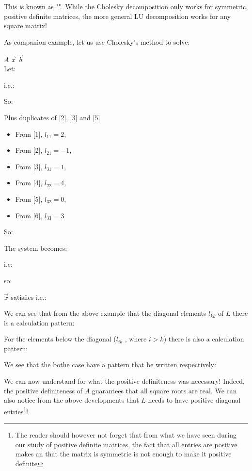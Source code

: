 	This is known as "". While the Cholesky decomposition only works for symmetric, positive definite matrices, the more general LU decomposition works for any square matrix!
	
	\pagebreak
	As companion example, let us use Cholesky's method to solve:
	
	\hspace{6.5cm} $A$ \hspace{1.4cm} $\vec{x}$ \hspace{1.4cm}
	$\vec{b}$ \\
	Let:
	
	i.e.:
	
	So:
	
	Plus duplicates of [2], [3] and [5]
	\begin{itemize}
		\item From [1], $l_{11} = 2$,
		\item From [2], $l_{21} = -1$,
		\item From [3], $l_{31} = 1$,
		\item From [4], $l_{22} = 4$,
		\item From [5], $l_{32} = 0$,
		\item From [6], $l_{33} = 3$ 
	\end{itemize}
	So:
	
	The system becomes:
	
	i.e:
	
	so:
	
	$\vec{x}$ satisfies i.e.:
	
	
	
	
	We can see that from the above example that the diagonal elements $l_{kk}$ of $L$ there is a calculation pattern:
	
	For the elements below the diagonal ($l_{ik}$ , where $i>k$) there is also a calculation pattern:
	
	We see that the bothe case have a pattern that be written respectively:
	
	We can now understand for what the positive definiteness was necessary! Indeed, the positive definiteness of $A$ guarantees that all square roots are real. We can also notice from the above developments that $L$ needs to have positive diagonal entries\footnote{The reader should however not forget that from what we have seen during our study of positive definite matrices, the fact that all entries are positive makes an that the matrix is symmetric is not enough to make it positive definite}!
	
